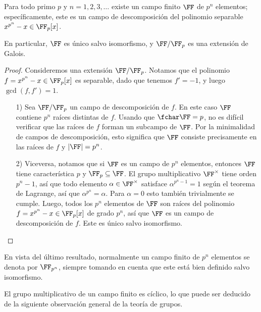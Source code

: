 \begin{teorema}
  Para todo primo $p$ y $n = 1,2,3,\ldots$ existe un campo finito $\FF$ de $p^n$
  elementos; específicamente, este es un campo de descomposición del polinomio
  separable $x^{p^n} - x \in \FF_p [x]$.

  En particular, $\FF$ es único salvo isomorfismo, y $\FF/\FF_p$ es una
  extensión de Galois.

  \begin{proof}
    Consideremos una extensión $\FF/\FF_p$. Notamos que el polinomio
    $f = x^{p^n} - x \in \FF_p [x]$ es separable, dado que tenemos $f' = -1$,
    y luego $\gcd (f,f') = 1$.

    \begin{enumerate}
    \item[1)] Sea $\FF/\FF_p$ un campo de descomposición de $f$. En este caso
      $\FF$ contiene $p^n$ raíces distintas de $f$. Usando que $\fchar \FF = p$,
      no es difícil verificar que las raíces de $f$ forman un subcampo de
      $\FF$. Por la minimalidad de campos de descomposición, esto significa
      que $\FF$ consiste precisamente en las raíces de $f$ y $|\FF| = p^n$.

    \item[2)] Viceversa, notamos que si $\FF$ es un campo de $p^n$ elementos,
      entonces $\FF$ tiene característica $p$ y $\FF_p \subseteq \FF$. El grupo
      multiplicativo $\FF^\times$ tiene orden $p^n-1$, así que todo elemento
      $\alpha\in\FF^\times$ satisface $\alpha^{p^n-1} = 1$ según el teorema de
      Lagrange, así que $\alpha^{p^n} = \alpha$. Para $\alpha = 0$ esto también
      trivialmente se cumple. Luego, todos los $p^n$ elementos de $\FF$ son
      raíces del polinomio $f= x^{p^n} - x \in \FF_p [x]$ de grado $p^n$, así
      que $\FF$ es un campo de descomposición de $f$. Este es único salvo
      isomorfismo. \qedhere
    \end{enumerate}
  \end{proof}
\end{teorema}

En vista del último resultado, normalmente un campo finito de $p^n$ elementos se
denota por $\FF_{p^n}$, siempre tomando en cuenta que este está bien definido
salvo isomorfismo.

\vspace{1em}

El grupo multiplicativo de un campo finito es cíclico, lo que puede ser deducido
de la siguiente observación general de la teoría de grupos.

